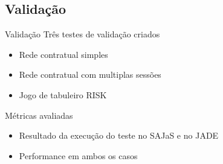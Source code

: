 
\subsection{Validação}
\begin{frame}{Validação}
	Três testes de validação criados
	\begin{itemize}
		\item Rede contratual simples
		\item Rede contratual com multiplas sessões
		\item Jogo de tabuleiro RISK
	\end{itemize}

	Métricas avaliadas
	\begin{itemize}
		\item Resultado da execução do teste no SAJaS e no JADE
		\item Performance em ambos os casos
	\end{itemize}
\end{frame}

